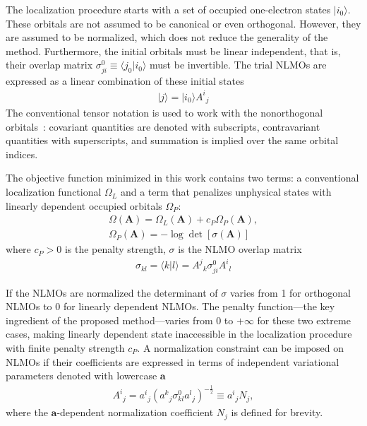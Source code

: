 \documentclass[aps,prl,reprint,amsmath,amssymb]{revtex4-1}
\newcommand{\ket}[1]{\ensuremath{\vert #1 \rangle}}
\newcommand{\braket}[2]{\ensuremath{\langle #1 \vert #2 \rangle}} %
\begin{document}
The localization procedure starts with a set of occupied one-electron states $\ket{i_0}$. 
These orbitals are not assumed to be canonical or even orthogonal. 
However, they are assumed to be normalized, which does not reduce the generality of the method. 
Furthermore, the initial orbitals must be linear independent, that is, their overlap matrix $\sigma_{ji}^0 \equiv \braket{j_0}{i_0}$ must be invertible. 
The trial NLMOs are expressed as a linear combination of these initial states
%
\begin{equation}
\begin{split}
\ket{j} = \ket{i_0} {A^i}_j  
\end{split}
\end{equation}
%
The conventional tensor notation is used to work with the nonorthogonal orbitals~\cite{head1998tensor}: covariant quantities are denoted with subscripts, contravariant quantities with superscripts, and summation is implied over the same orbital indices.

The objective function minimized in this work contains two terms: a conventional localization functional $\Omega_L$ and a term that penalizes unphysical states with linearly dependent occupied orbitals $\Omega_P$:
%
\begin{equation} \label{eq:fun-pen}
\begin{split}
\Omega(\mathbf{A}) = \Omega_L(\mathbf{A}) + c_P \Omega_P(\mathbf{A}), \\
\Omega_P(\mathbf{A}) = - \log \det \left[ \sigma (\mathbf{A}) \right]
\end{split}
\end{equation}
%
where $c_P > 0$ is the penalty strength, $\sigma$ is the NLMO overlap matrix 
%
\begin{equation}
\begin{split}
\sigma_{kl} = \braket{k}{l} = {A^j}_k \sigma_{ji}^0{A^i}_l
\end{split}
\end{equation}
%

If the NLMOs are normalized the determinant of $\sigma$ varies from 1 for orthogonal NLMOs to 0 for linearly dependent NLMOs. The penalty function---the key ingredient of the proposed method---varies from 0 to $+\infty$ for these two extreme cases, making linearly dependent state inaccessible in the localization procedure with finite penalty strength $c_P$. 
A normalization constraint can be imposed on NLMOs if their coefficients are expressed in terms of independent variational parameters denoted with lowercase $\mathbf{a}$
%
\begin{equation}
\begin{split}
{A^i}_j = {a^i}_{j} ({a^k}_{j} \sigma^0_{kl}{a^l}_{j})^{-\frac{1}{2}} \equiv {a^i}_{j} N_j ,
\end{split}
\end{equation}
%
where the $\mathbf{a}$-dependent normalization coefficient $N_j$ is defined for brevity. 
\end{document}

